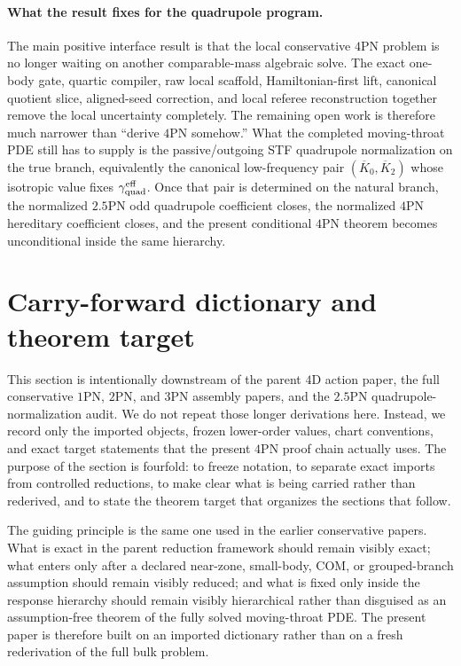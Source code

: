 \documentclass[11pt]{article}
\begin{document}
\paragraph{What the result fixes for the quadrupole program.}
The main positive interface result is that the local conservative $4$PN problem
is no longer waiting on another comparable-mass algebraic solve.  The exact
one-body gate, quartic compiler, raw local scaffold, Hamiltonian-first lift,
canonical quotient slice, aligned-seed correction, and local referee
reconstruction together remove the local uncertainty completely.  The remaining
open work is therefore much narrower than ``derive $4$PN somehow.''  What the
completed moving-throat PDE still has to supply is the passive/outgoing STF
quadrupole normalization on the true branch, equivalently the canonical
low-frequency pair $(\overline K_0,\overline K_2)$ whose isotropic value fixes
$\gamma_{\rm quad}^{\rm eff}$.  Once that pair is determined on the natural
branch, the normalized $2.5$PN odd quadrupole coefficient closes, the normalized
$4$PN hereditary coefficient closes, and the present conditional $4$PN theorem
becomes unconditional inside the same hierarchy.


\section{Carry-forward dictionary and theorem target}
\label{sec:dictionary}

This section is intentionally downstream of the parent $4$D action paper, the
full conservative $1$PN, $2$PN, and $3$PN assembly papers, and the $2.5$PN
quadrupole-normalization audit.  We do not repeat those longer derivations
here.  Instead, we record only the imported objects, frozen lower-order values,
chart conventions, and exact target statements that the present $4$PN proof
chain actually uses.  The purpose of the section is fourfold: to freeze
notation, to separate exact imports from controlled reductions, to make clear
what is being carried rather than rederived, and to state the theorem target
that organizes the sections that follow.

The guiding principle is the same one used in the earlier conservative papers.
What is exact in the parent reduction framework should remain visibly exact;
what enters only after a declared near-zone, small-body, COM, or grouped-branch
assumption should remain visibly reduced; and what is fixed only inside the
response hierarchy should remain visibly hierarchical rather than disguised as
an assumption-free theorem of the fully solved moving-throat PDE.  The present
paper is therefore built on an imported dictionary rather than on a fresh
rederivation of the full bulk problem.
\end{document}
